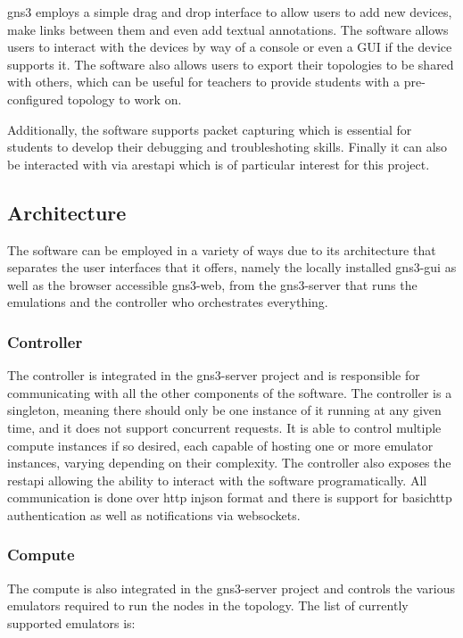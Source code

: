 \ac{gns3} employs a simple drag and drop interface to allow users to add new devices, make links between them 
and even add textual annotations. The software allows users to interact with the devices by way of a console or even a GUI
if the device supports it. The software also allows users to export their topologies to be shared with others, which can
be useful for teachers to provide students with a pre-configured topology to work on.

Additionally, the software supports packet capturing which is essential for students to develop their debugging and 
troubleshoting skills. Finally it can also be interacted with via a\ac{rest}\ac{api} which is of particular interest
for this project.

\subsection{Architecture}
The software can be employed in a variety of ways due to its architecture \cite{GNS3Architecture} that separates the user 
interfaces that it offers, namely the locally installed gns3-gui as well as the browser accessible gns3-web, from the 
gns3-server that runs the emulations and the controller who orchestrates everything.

\subsubsection{Controller}
The controller is integrated in the gns3-server project and is responsible for communicating with all the other components 
of the software. The controller is a singleton, meaning there should only be one instance of it running at any given time, 
and it does not support concurrent requests. It is able to control multiple compute instances if so desired, each capable 
of hosting one or more emulator instances, varying depending on their complexity. The controller also exposes the 
\ac{rest}\ac{api} allowing the ability to interact with the software programatically. All communication is done over
\ac{http} in\ac{json} format and there is support for basic\ac{http} authentication as well as notifications via websockets.

\subsubsection{Compute}
The compute is also integrated in the gns3-server project and controls the various emulators required to run the nodes 
in the topology.
The list of currently supported emulators is:

